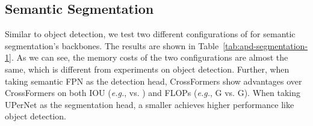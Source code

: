 \documentclass{article} \usepackage{iclr2022_conference,times}
\newcommand{\eg}{{\emph{e.g.}}}
\begin{document}
\subsection{Semantic Segmentation}

Similar to object detection, we test two different configurations of  for semantic segmentation's backbones. The results are shown in Table~\ref{tab:apd-segmentation-1}. As we can see, the memory costs of the two configurations are almost the same, which is different from experiments on object detection. Further, when taking semantic FPN as the detection head, CrossFormers show advantages over CrossFormers on both IOU (\eg,  vs. ) and FLOPs (\eg, G vs. G). When taking UPerNet as the segmentation head, a smaller  achieves higher performance like object detection.
    
\end{document}

